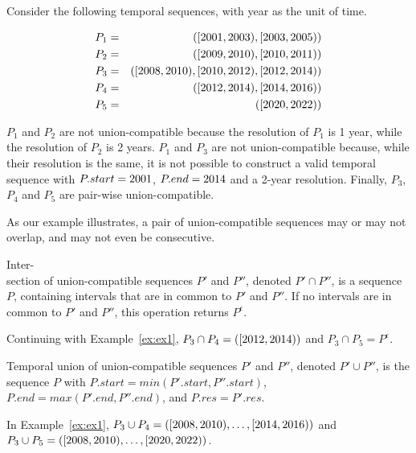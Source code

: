 \begin{example}
\label{ex:ex1}
Consider the following temporal sequences, with year as the unit of
time.

\begin{eqnarray*}
P_1 & = & ([2001,2003),[2003,2005))\\
P_2 & = & ([2009,2010),[2010,2011)) \\
P_3 & = & ([2008,2010),[2010,2012),[2012,2014))\\
P_4 & = & ([2012,2014),[2014,2016))\\
P_5 & = & ([2020,2022)) \\
\end{eqnarray*}

$P_1$ and $P_2$ are not union-compatible because the resolution of
  $P_1$ is 1 year, while the resolution of $P_2$ is 2 years.  $P_1$
  and $P_3$ are not union-compatible because, while their resolution
  is the same, it is not possible to construct a valid temporal
  sequence with $P.start=2001$, $P.end=2014$ and a 2-year
  resolution.  Finally, $P_3$, $P_4$ and $P_5$ are pair-wise
  union-compatible.
\end{example}

As our example illustrates, a pair of union-compatible sequences may
or may not overlap, and may not even be consecutive.

\begin{definition}  
Inter-\\section of union-compatible sequences $P'$ and $P''$, denoted $P'
\cap P''$, is a sequence $P$, containing intervals that are in common
to $P'$ and $P''$.  If no intervals are in common to $P'$ and $P''$,
this operation returns $P^{\epsilon}$.
\label{def:tseqand}
\end{definition}

Continuing with Example~\ref{ex:ex1}, $P_3 \cap P_4 =
([2012,2014))$ and $P_3 \cap P_5 = P^{\epsilon}$.

\begin{definition} 
Temporal union of union-compatible sequences $P'$ and $P''$, denoted
$P' \cup P''$, is the sequence $P$ with $P.start = min(P'.start,
P''.start)$, $P.end = max(P'.end, P''.end)$, and $P.res = P'.res$.
\label{def:tseqor}
\end{definition}

In Example~\ref{ex:ex1}, $P_3 \cup P_4 =
([2008,2010),\ldots,[2014,2016))$ and $P_3
    \cup P_5 = ([2008,2010), \ldots,
      [2020,2022))$.

